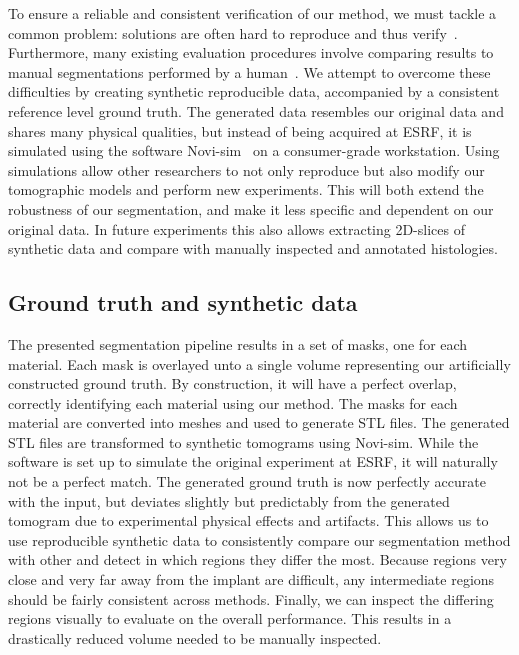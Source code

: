 To ensure a reliable and consistent verification of our method, we must tackle a
common problem: solutions are often hard to reproduce and thus
verify~\cite{replication-crisis}. Furthermore, many existing evaluation
procedures involve comparing results to manual segmentations performed by a
human~\cite{seg_literature_review}. We attempt to overcome these difficulties by
creating synthetic reproducible data, accompanied by a consistent reference
level ground truth. The generated data resembles our original data and shares
many physical qualities, but instead of being acquired at ESRF, it is simulated
using the software Novi-sim~\cite{novisim} on a consumer-grade workstation.
Using simulations allow other researchers to not only reproduce but also modify
our tomographic models and perform new experiments. This will both extend the
robustness of our segmentation, and make it less specific and dependent on our
original data.  In future experiments this also allows extracting 2D-slices of
synthetic data and compare with manually inspected and annotated histologies.

\subsection{Ground truth and synthetic data}

The presented segmentation pipeline results in a set of masks, one for each
material.  Each mask is overlayed unto a single volume representing our
artificially constructed ground truth. By construction, it will have a perfect
overlap, correctly identifying each material using our method.  The masks for
each material are converted into meshes and used to generate STL files.  The
generated STL files are transformed to synthetic tomograms using Novi-sim.
While the software is set up to simulate the original experiment at ESRF, it
will naturally not be a perfect match. The generated ground truth is now
perfectly accurate with the input, but deviates slightly but predictably from
the generated tomogram due to experimental physical effects and artifacts. This
allows us to use reproducible synthetic data to consistently compare our
segmentation method with other and detect in which regions they differ the
most. Because regions very close and very far away from the implant are
difficult, any intermediate regions should be fairly consistent across methods.
Finally, we can inspect the differing regions visually to evaluate on the
overall performance. This results in a drastically reduced volume needed to be
manually inspected.

